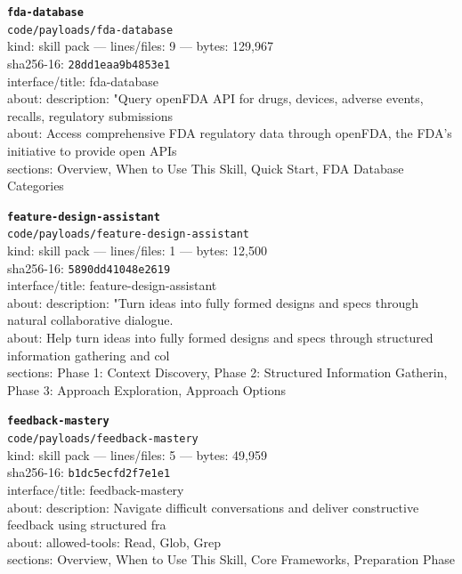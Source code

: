 \noindent\textbf{\texttt{fda-database}}\\
\texttt{code/payloads/fda-database}\\
kind: skill pack --- lines/files: 9 --- bytes: 129,967\\
sha256-16: \texttt{28dd1eaa9b4853e1}\\
interface/title: fda-database\\
about: description: "Query openFDA API for drugs, devices, adverse events, recalls, regulatory submissions \\
about: Access comprehensive FDA regulatory data through openFDA, the FDA's initiative to provide open APIs \\
sections: Overview, When to Use This Skill, Quick Start, FDA Database Categories\\
\vspace*{6.0pt}
\newpage

\noindent\textbf{\texttt{feature-design-assistant}}\\
\texttt{code/payloads/feature-design-assistant}\\
kind: skill pack --- lines/files: 1 --- bytes: 12,500\\
sha256-16: \texttt{5890dd41048e2619}\\
interface/title: feature-design-assistant\\
about: description: "Turn ideas into fully formed designs and specs through natural collaborative dialogue.\\
about: Help turn ideas into fully formed designs and specs through structured information gathering and col\\
sections: Phase 1: Context Discovery, Phase 2: Structured Information Gatherin, Phase 3: Approach Exploration, Approach Options\\
\vspace*{6.0pt}

\noindent\textbf{\texttt{feedback-mastery}}\\
\texttt{code/payloads/feedback-mastery}\\
kind: skill pack --- lines/files: 5 --- bytes: 49,959\\
sha256-16: \texttt{b1dc5ecfd2f7e1e1}\\
interface/title: feedback-mastery\\
about: description: Navigate difficult conversations and deliver constructive feedback using structured fra\\
about: allowed-tools: Read, Glob, Grep\\
sections: Overview, When to Use This Skill, Core Frameworks, Preparation Phase\\
\vspace*{6.0pt}

